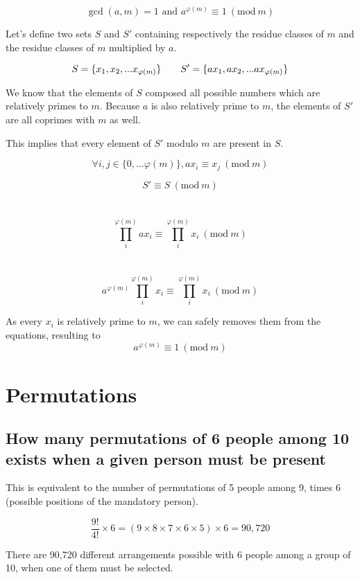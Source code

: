 \documentclass{article}
\newcommand{\congru}[3]{#1 \equiv #2\ (\text{mod}\ #3)}
\begin{document}
\begin{equation}
    \gcd(a,m) = 1\text{ and }\congru{a^{\varphi(m)}}{1}{m}
\end{equation}

Let's define two sets $S$ and $S'$ containing respectively the residue classes of $m$ and the residue classes of $m$ multiplied by $a$.

\vspace*{-0.5em}$$ S = \{x_1, x_2, ... x_{\varphi(m)}\} \hspace*{2em} S' = \{ax_1, ax_2, ... ax_{\varphi(m)}\} $$

We know that the elements of $S$ composed all possible numbers which are relatively primes to $m$. Because $a$ is also relatively prime to $m$, the elements of $S'$ are all coprimes with $m$ as well.

This implies that every element of $S'$ modulo $m$ are present in $S$.

$$ \forall i,j \in \{0,...\varphi(m)\}, \congru{ax_i}{x_j}{m} $$

$$ \congru{S'}{S}{m} $$\\\vspace*{-3.5em}\\
$$ \congru{\prod_i^{\varphi(m)}{ax_i}}{\prod_i^{\varphi(m)}{x_i}}{m} $$\\\vspace*{-3em}\\
$$ \congru{a^{\varphi(m)}\prod_i^{\varphi(m)}{x_i}}{\prod_i^{\varphi(m)}{x_i}}{m} $$

As every $x_i$ is relatively prime to $m$, we can safely removes them from the equations, resulting to $$ \congru{a^{\varphi(m)}}{1}{m} $$

\break\vfill
\section{Permutations}

\subsection{How many permutations of 6 people among 10 exists when a given person must be present}

This is equivalent to the number of permutations of 5 people among 9, times 6 (possible positions of the mandatory person).

$$ \frac{9!}{4!}\times6 = (9\times8\times7\times6\times5)\times6 = 90,720 $$

There are 90,720 different arrangements possible with 6 people among a group of 10, when one of them must be selected.
\end{document}
